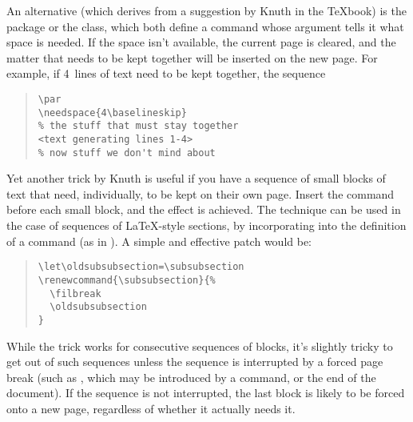 An alternative (which derives from a suggestion by Knuth in the
\TeX{}book) is the package  or the  class,
which both define a command  whose argument tells it
what space is needed.  If the space isn't available, the current page
is cleared, and the matter that needs to be kept together will be
inserted on the new page.  For example, if 4~lines of text need to be
kept together, the sequence
\begin{quote}
\begin{verbatim}
\par
\needspace{4\baselineskip}
% the stuff that must stay together
<text generating lines 1-4>
% now stuff we don't mind about
\end{verbatim}
\end{quote}
Yet another trick by Knuth is useful if you have a sequence of small
blocks of text that need, individually, to be kept on their own page.
Insert the command  before each small block, and the
effect is achieved.  The technique can be used in the case of
sequences of \LaTeX{}-style sections, by incorporating 
into the definition of a command (as in %
).  A simple and effective
patch would be:
\begin{quote}
\begin{verbatim}
\let\oldsubsubsection=\subsubsection
\renewcommand{\subsubsection}{%
  \filbreak
  \oldsubsubsection
}
\end{verbatim}
\end{quote}
While the trick works for consecutive sequences of blocks, it's
slightly tricky to get out of such sequences unless the sequence is
interrupted by a forced page break (such as , which may
be introduced by a  command, or the end of the document).
If the sequence is not interrupted, the last block is likely to be
forced onto a new page, regardless of whether it actually needs it.

